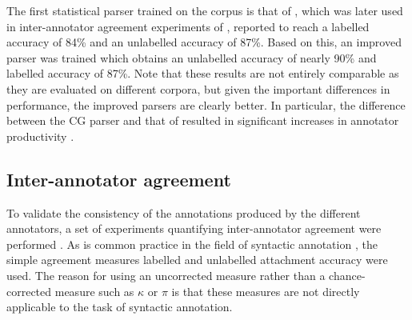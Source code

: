\documentclass[11pt,a4paper]{article}
\begin{document}
The first statistical parser trained on the corpus is that of
, which was later used in inter-annotator agreement
experiments of , reported to reach a labelled accuracy of
84\% and an unlabelled accuracy of 87\%. Based on this, an improved parser was
trained which obtains an unlabelled accuracy of nearly 90\% and labelled
accuracy of 87\%. Note that these results are not entirely comparable as they
are evaluated on different corpora, but given the important differences in
performance, the improved parsers are clearly better. In particular, the
difference between the CG parser and that of  resulted in
significant increases in annotator productivity \cite{Skjaerholt:13}.


%

\subsection{Inter-annotator agreement}
\label{sc:inter-a}
To validate the consistency of the annotations produced by the different
annotators, a set of experiments quantifying inter-annotator agreement were
performed \cite{Skjaerholt:13}. As is common practice in the field of
syntactic annotation \cite{Civit:ea:03,Brants:00,Bra:Han:02,Hajic:04}, the
simple agreement measures labelled and unlabelled attachment accuracy were
used. The reason for using an uncorrected measure rather than a
chance-corrected measure such as $\kappa$ or $\pi$ is that these measures are
not directly applicable to the task of syntactic annotation.
\end{document}
